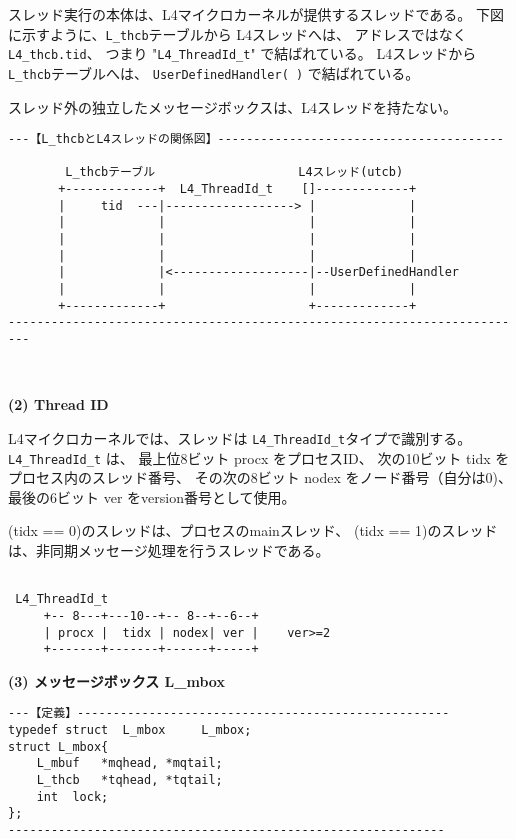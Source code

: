 スレッド実行の本体は、L4マイクロカーネルが提供するスレッドである。
下図に示すように、\verb|L_thcb|テーブルから L4スレッドへは、
アドレスではなく\verb|L4_thcb.tid|、
つまり "\verb|L4_ThreadId_t|" で結ばれている。
L4スレッドから\verb|L_thcb|テーブルへは、
\verb|UserDefinedHandler( )| で結ばれている。

スレッド外の独立したメッセージボックスは、L4スレッドを持たない。

{\small\begin{verbatim}
---【L_thcbとL4スレッドの関係図】----------------------------------------

        L_thcbテーブル                    L4スレッド(utcb)
       +-------------+  L4_ThreadId_t    []-------------+
       |     tid  ---|------------------> |             |
       |             |                    |             |
       |             |                    |             |
       |             |                    |             |
       |             |<-------------------|--UserDefinedHandler
       |             |                    |             |
       +-------------+                    +-------------+
-------------------------------------------------------------------------
\end{verbatim}}



　


{\flushleft\bf (2) Thread ID}

L4マイクロカーネルでは、スレッドは \verb|L4_ThreadId_t|タイプで識別する。
\verb|L4_ThreadId_t| は、
最上位8ビット procx をプロセスID、
次の10ビット tidx をプロセス内のスレッド番号、
その次の8ビット nodex をノード番号（自分は0)、
最後の6ビット ver をversion番号として使用。

(tidx == 0)のスレッドは、プロセスのmainスレッド、
(tidx == 1)のスレッドは、非同期メッセージ処理を行うスレッドである。

{\small\begin{verbatim}

 L4_ThreadId_t
     +-- 8---+---10--+-- 8--+--6--+
     | procx |  tidx | nodex| ver |    ver>=2
     +-------+-------+------+-----+
\end{verbatim}}




{\flushleft\bf (3) メッセージボックス L\_mbox}

\begin{verbatim}
---【定義】----------------------------------------------------
typedef struct  L_mbox     L_mbox;
struct L_mbox{
    L_mbuf   *mqhead, *mqtail;
    L_thcb   *tqhead, *tqtail;
    int  lock;
};
-------------------------------------------------------------
\end{verbatim}

